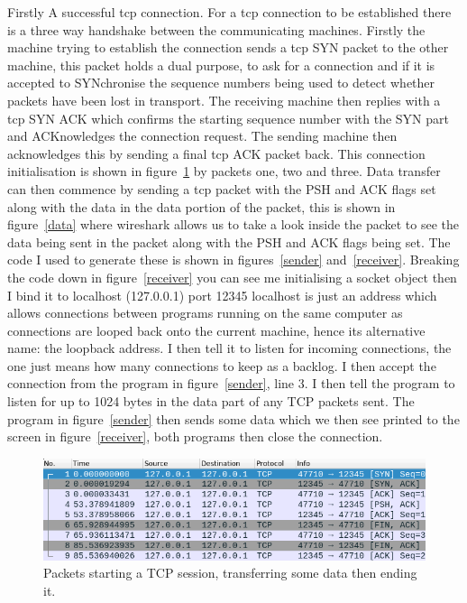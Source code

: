 \documentclass[titlepage]{article}
\begin{document}
Firstly A successful \gls{tcp} connection. For a \gls{tcp} connection to be established there is a 
three way handshake between the communicating machines. Firstly the machine trying to establish the 
connection sends a \gls{tcp} SYN packet to the other machine, this packet holds a dual purpose, to 
ask for a connection and if it is accepted to SYNchronise the sequence numbers being used to detect 
whether packets have been lost in transport. The receiving machine then replies with a \gls{tcp} SYN 
ACK which confirms the starting sequence number with the SYN part and ACKnowledges the connection 
request. The sending machine then acknowledges this by sending a final \gls{tcp} ACK packet back. 
This connection initialisation is shown in figure~\ref{data_transfer} by packets one, two and three. 
Data transfer can then commence by sending a \gls{tcp} packet with the PSH and ACK flags set along 
with the data in the data portion of the packet, this is shown in figure~\ref{data} where wireshark 
allows us to take a look inside the packet to see the data being sent in the packet along with the 
PSH and ACK flags being set. The code I used to generate these is shown in figures~\ref{sender} 
and~\ref{receiver}. Breaking the code down in figure~\ref{receiver} you can see me initialising a 
socket object then I bind it to localhost (127.0.0.1) port 12345 localhost is just an address which 
allows connections between programs running on the same computer as connections are looped back onto 
the current machine, hence its alternative name: the loopback address. I then tell it to listen for 
incoming connections, the one just means how many connections to keep as a backlog. I then accept 
the connection from the program in figure~\ref{sender}, line 3. I then tell the program to listen 
for up to 1024 bytes in the data part of any TCP packets sent. The program in figure~\ref{sender} 
then sends some data which we then see printed to the screen in figure~\ref{receiver}, both programs 
then close the connection.

\begin{figure}[H]
  \centering
  \includegraphics[width=\textwidth]{screenshots/data_transfer.png}
  \caption{%
    Packets starting a TCP session, transferring some data then ending it.
  }\label{data_transfer}
\end{figure}
\end{document}
